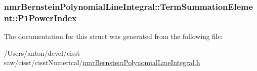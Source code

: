 \subsubsection[{P1\+Power\+Index}]{ nmr\+Bernstein\+Polynomial\+Line\+Integral\+::\+Term\+Summation\+Element\+::\+P1\+Power\+Index}\label{structnmr_bernstein_polynomial_line_integral_1_1_term_summation_element_a3eca58974e87a3625ec449a076fed408}


The documentation for this struct was generated from the following file\+:\begin{DoxyCompactItemize}
\item 
/\+Users/anton/devel/cisst-\/saw/cisst/cisst\+Numerical/\hyperlink{nmr_bernstein_polynomial_line_integral_8h}{nmr\+Bernstein\+Polynomial\+Line\+Integral.\+h}\end{DoxyCompactItemize}
